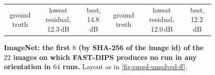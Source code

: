 \begin{figure}[p]
\begin{tabular}{@{}cccccc@{}}
ground truth & lowest residual, 12.3\,dB & best, 14.8\,dB & ground truth & lowest residual, 12.0\,dB & best, 12.2\,dB \\[3pt]
\end{tabular}
\caption{\textbf{ImageNet: the first $8$ (by SHA-256 of the image id) of the $22$ images on which FAST-DIPS produces no \good run in any orientation in $64$ runs.} Layout as in \cref{fig:suppl-unsolved-ff}.}
\label{fig:suppl-unsolved-in}
\end{figure}
\clearpage
